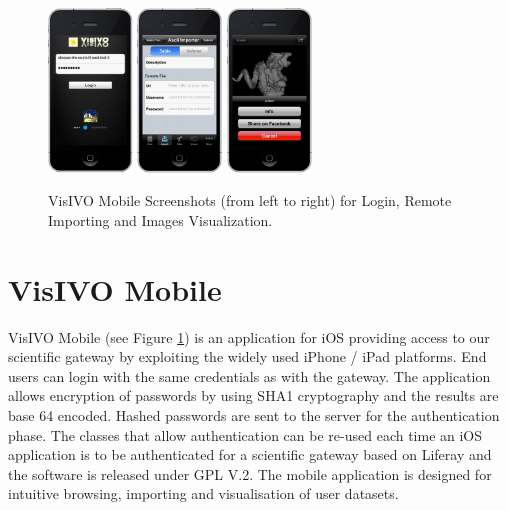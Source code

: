 \begin{figure}
    \centering
    \includegraphics[width=0.2\textwidth]{part5/Costa_O08/O08_f3.eps}
    \includegraphics[width=0.2\textwidth]{part5/Costa_O08/O08_f4.eps}
    \includegraphics[width=0.2\textwidth]{part5/Costa_O08/O08_f5.eps}
    \caption{VisIVO Mobile Screenshots (from left to right) for Login, Remote Importing and Images Visualization.}
\label{fig:visivomobile}
\end{figure}

\section{VisIVO Mobile}
VisIVO Mobile  (see Figure \ref{fig:visivomobile}) is an application for iOS providing access to our scientific gateway by exploiting the widely used iPhone / iPad platforms. End users can login with the same credentials as with the gateway. The application allows encryption of passwords by using SHA1 cryptography and the results are base 64 encoded. Hashed passwords are sent to the server for the authentication phase. The classes that allow authentication can be re-used each time an iOS application is to be authenticated for a scientific gateway based on Liferay  and the software is released under GPL V.2. The mobile application is designed for intuitive browsing, importing and visualisation of user datasets.
